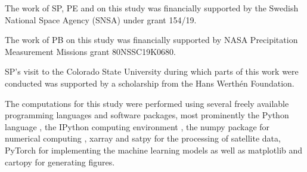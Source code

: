 \documentclass[journal abbreviation, manuscript]{copernicus}
\begin{document}
\noappendix       %








\begin{acknowledgements}

  The work of SP, PE and on this study was financially supported by the Swedish
  National Space Agency (SNSA) under grant 154/19.

  The work of PB on this study was financially supported by NASA Precipitation
  Measurement Missions grant 80NSSC19K0680.

  SP's visit to the Colorado State University during which parts of this work were
  conducted was supported by a scholarship from the Hans Werthén Foundation.

  The computations for this study were performed using several freely available
  programming languages and software packages, most prominently the Python
  language \citep{python}, the IPython computing environment \citep{ipython},
  the numpy package for numerical computing \citep{numpy}, xarray \citep{xarray}
  and satpy \citep{satpy} for the processing of satellite data, PyTorch
  \citep{pytorch} for implementing the machine learning models as well as
  matplotlib \citep{matplotlib} and cartopy \citep{cartopy} for generating
  figures.

\end{acknowledgements}
\end{document}
